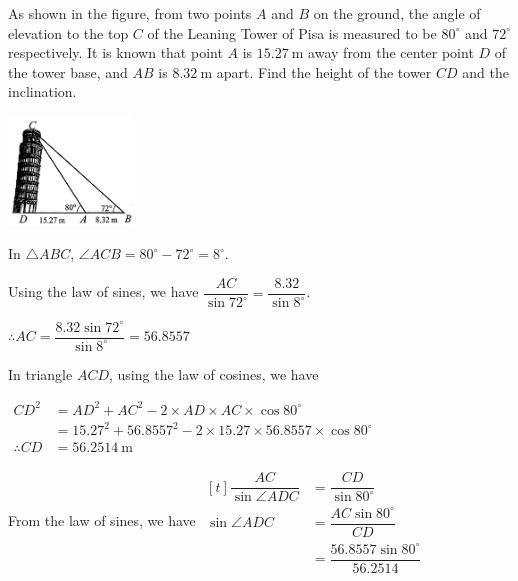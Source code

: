 \documentclass{report}
\begin{document}
    \begin{question}
       \begin{vwcol}[widths={0.6,0.4}, sep=8mm, rule=0pt]
             As shown in the figure, from two points $A$ and $B$ on the ground, the angle of elevation to the top $C$ of the Leaning Tower of Pisa is measured to be $80^\circ$ and $72^\circ$ respectively. It is known that point $A$ is $15.27 \mathrm{~m}$ away from the center point $D$ of the tower base, and $AB$ is $8.32 \mathrm{~m}$ apart. Find the height of the tower $CD$ and the inclination.

            \includegraphics[width=0.25\textwidth]{assets/10-56.jpg}
        \end{vwcol}

        \sol{}
        
        \begin{vwcol}[widths={0.6,0.4}, sep=8mm, rule=0pt,justify=flushleft]
            \noindent In $\triangle ABC$, $\angle ACB = 80^\circ - 72^\circ = 8^\circ$.
        
            \noindent Using the law of sines, we have $\dfrac{AC}{\sin 72^\circ} = \dfrac{8.32}{\sin 8^\circ}$.
            
            \noindent $
            \therefore AC = \dfrac{8.32 \sin 72^\circ}{\sin 8^\circ} = 56.8557
            $

            \vspace{1em}
            \noindent In triangle $ACD$, using the law of cosines, we have
                
            \vspace{1em}
            \noindent $
            \begin{aligned}
            CD^2 & = AD^2 + AC^2 - 2 \times AD \times AC \times \cos 80^\circ \\
            & = 15.27^2 + 56.8557^2 - 2 \times 15.27 \times 56.8557 \times \cos 80^\circ \\
            \therefore CD & = 56.2514 \mathrm{~m}
            \end{aligned}
            $

            \noindent From the law of sines, we have $\begin{aligned}[t] \dfrac{A C}{\sin \angle A D C} & =\dfrac{C D}{\sin 80^{\circ}} \\ \sin \angle A D C & =\dfrac{A C \sin 80^{\circ}}{C D} \\ & =\dfrac{56.8557 \sin 80^{\circ}}{56.2514}\end{aligned}$


\end{vwcol}
\end{question}
\end{document}
